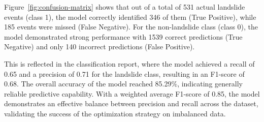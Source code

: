 Figure~\ref{fig:confusion-matrix} shows that out of a total of 531 actual landslide events (class 1), the model correctly identified 346 of them (True Positive), while 185 events were missed (False Negative). For the non-landslide class (class 0), the model demonstrated strong performance with 1539 correct predictions (True Negative) and only 140 incorrect predictions (False Positive).

This is reflected in the classification report, where the model achieved a recall of 0.65 and a precision of 0.71 for the landslide class, resulting in an F1-score of 0.68. The overall accuracy of the model reached 85.29\%, indicating generally reliable predictive capability. With a weighted average F1-score of 0.85, the model demonstrates an effective balance between precision and recall across the dataset, validating the success of the optimization strategy on imbalanced data.
